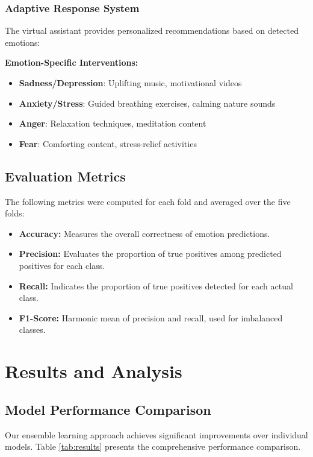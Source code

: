 \documentclass[conference]{IEEEtran}
\begin{document}
\subsubsection{Adaptive Response System}
The virtual assistant provides personalized recommendations based on detected emotions:

\textbf{Emotion-Specific Interventions:}
\begin{itemize}
    \item \textbf{Sadness/Depression}: Uplifting music, motivational videos
    \item \textbf{Anxiety/Stress}: Guided breathing exercises, calming nature sounds
    \item \textbf{Anger}: Relaxation techniques, meditation content
    \item \textbf{Fear}: Comforting content, stress-relief activities
\end{itemize}

\subsection{Evaluation Metrics}
The following metrics were computed for each fold and averaged over the five folds:
\begin{itemize}
    \item \textbf{Accuracy:} Measures the overall correctness of emotion predictions.
    \item \textbf{Precision:} Evaluates the proportion of true positives among predicted positives for each class.
    \item \textbf{Recall:} Indicates the proportion of true positives detected for each actual class.
    \item \textbf{F1-Score:} Harmonic mean of precision and recall, used for imbalanced classes.
\end{itemize}

\section{Results and Analysis}

\subsection{Model Performance Comparison}
Our ensemble learning approach achieves significant improvements over individual models. Table \ref{tab:results} presents the comprehensive performance comparison.
\end{document}
